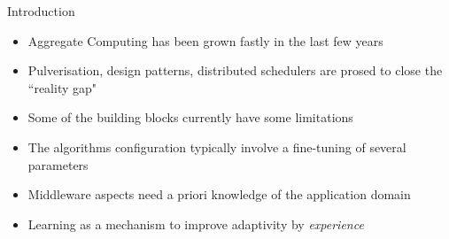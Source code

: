 \begin{frame}{ \playfairblack Introduction }
  \begin{card}
    \begin{itemize}
      \item[\success{\faThumbsUp}] Aggregate Computing has been grown fastly in the last few years
      \item[\success{\faThumbsUp}] Pulverisation, design patterns, distributed schedulers are prosed to close the ``reality gap"
      \item[\failure{\faThumbsDown}] Some of the building blocks currently have some limitations
      \item[\failure{\faThumbsDown}] The algorithms configuration typically involve a fine-tuning of several parameters
      \item[\failure{\faThumbsDown}] Middleware aspects need a priori knowledge of the application domain
      \item[\highlightAlt{\faLightbulb}] Learning as a mechanism to improve adaptivity by  \emph{experience}
    \end{itemize}
  \end{card}
\end{frame}